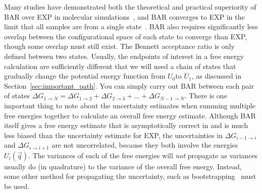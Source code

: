 \documentclass[9pt,bestpractices]{livecoms}
\begin{document}
Many studies have demonstrated both the theoretical and practical superiority of BAR over EXP in molecular
simulations~\cite{shirts2005comparison,lu2003appropriate}, and BAR converges to EXP in the limit that all samples are from a single state~\cite{bennett1976efficient,bennett1976efficient,shirts2003equilibriuma}. BAR also requires significantly less overlap between the configurational space of each state to converge than EXP, though some overlap must still exist.
%
The Bennett acceptance ratio is only defined between two states. Usually, the endpoints of interest in a free energy calculation are sufficiently different that we will need a chain of states that gradually change the potential energy function from $U_0$to $U_1$, as discussed in Section~\ref{sec:important_path}. You can simply carry out BAR between each pair of states $\Delta G_{1 \rightarrow N} = \Delta {G_{1\rightarrow 2}} + \Delta {G_{2\rightarrow 3}} +  \ldots + \Delta G_{N-1\rightarrow N}$.
%
There is one important thing to note about the uncertainty estimates when summing multiple free energies together to calculate an overall free energy estimate. Although BAR itself gives a free energy estimate that is asymptotically correct in and is much less biased than the uncertainty estimate for EXP, the uncertainties in $\Delta {G_{i-1\rightarrow i}}$ and $\Delta {G_{i\rightarrow i+1}}$ are not uncorrelated, because they both involve the energies $U_i(\vec{q})$. The variances of each of the free energies will \textit{not} propagate as variances usually do (in quadrature) to the variance of the overall free energy. Instead, some other method for propagating the uncertainty, such as bootstrapping~\cite{grossfield2018best} must be used.
%
\end{document}

